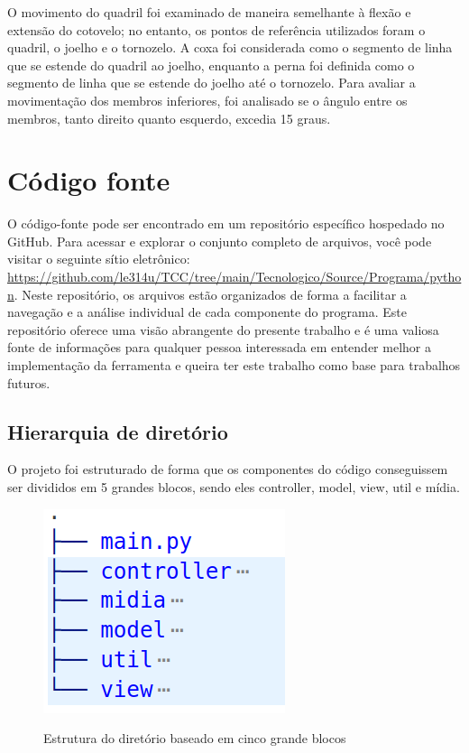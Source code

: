 O movimento do quadril foi examinado de maneira semelhante à flexão e extensão do cotovelo; no entanto, os pontos de referência utilizados foram o quadril, o joelho e o tornozelo. A coxa foi considerada como o segmento de linha que se estende do quadril ao joelho, enquanto a perna foi definida como o segmento de linha que se estende do joelho até o tornozelo. Para avaliar a movimentação dos membros inferiores, foi analisado se o ângulo entre os membros, tanto direito quanto esquerdo, excedia 15 graus.





\section[Código fonte]{Código fonte}

O código-fonte pode ser encontrado em um repositório específico hospedado no GitHub. Para acessar e explorar o conjunto completo de arquivos, você pode visitar o seguinte sítio eletrônico: \url{https://github.com/le314u/TCC/tree/main/Tecnologico/Source/Programa/python}. Neste repositório, os arquivos estão organizados de forma a facilitar a navegação e a análise individual de cada componente do programa. Este repositório oferece uma visão abrangente do presente trabalho e é uma valiosa fonte de informações para qualquer pessoa interessada em entender melhor a implementação da ferramenta e queira ter este trabalho como base para trabalhos futuros.
 
 

\subsection[Hierarquia de diretório]{Hierarquia de diretório}


O projeto foi estruturado de forma que os componentes do código conseguissem ser divididos em 5 grandes blocos, sendo eles controller, model, view, util e mídia.

\begin{figure}[H]
	\centering
    \caption{Estrutura do diretório baseado em cinco grande blocos }
	\includegraphics[scale=0.5]{figuras/diretorios/Blocos.png}
	\label{fig:blocos}
\end{figure}

